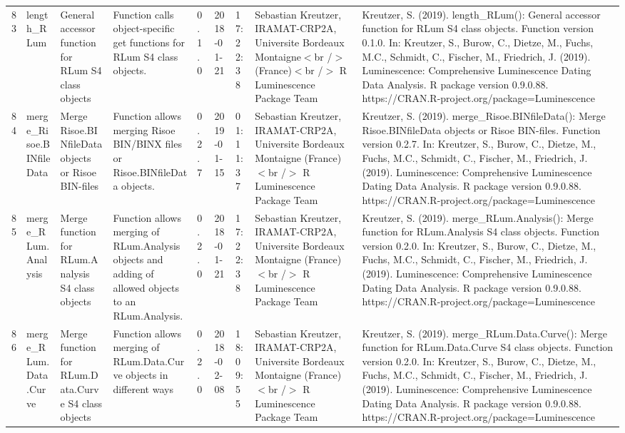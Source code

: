\begin{table}[ht]
\begin{tabular}{rllllllll}
  83 & length\_RLum & General accessor function for RLum S4 class objects & Function calls object-specific get functions for RLum S4 class objects. & 0.1.0 & 2018-01-21 & 17:22:38
 & Sebastian Kreutzer, IRAMAT-CRP2A, Universite Bordeaux Montaigne$<$br /$>$ (France)$<$br /$>$  R Luminescence Package Team & Kreutzer, S. (2019). length\_RLum(): General accessor function for RLum S4 class objects. Function version 0.1.0. In: Kreutzer, S., Burow, C., Dietze, M., Fuchs, M.C., Schmidt, C., Fischer, M., Friedrich, J. (2019). Luminescence: Comprehensive Luminescence Dating Data Analysis. R package version 0.9.0.88. https://CRAN.R-project.org/package=Luminescence
 \\ 
  84 & merge\_Risoe.BINfileData & Merge Risoe.BINfileData objects or Risoe BIN-files & Function allows merging Risoe BIN/BINX files or Risoe.BINfileData objects. & 0.2.7 & 2019-01-15 & 01:11:37
 & Sebastian Kreutzer, IRAMAT-CRP2A, Universite Bordeaux Montaigne (France)$<$br /$>$  R Luminescence Package Team & Kreutzer, S. (2019). merge\_Risoe.BINfileData(): Merge Risoe.BINfileData objects or Risoe BIN-files. Function version 0.2.7. In: Kreutzer, S., Burow, C., Dietze, M., Fuchs, M.C., Schmidt, C., Fischer, M., Friedrich, J. (2019). Luminescence: Comprehensive Luminescence Dating Data Analysis. R package version 0.9.0.88. https://CRAN.R-project.org/package=Luminescence
 \\ 
  85 & merge\_RLum.Analysis & Merge function for RLum.Analysis S4 class objects & Function allows merging of RLum.Analysis objects and adding of allowed objects to an RLum.Analysis. & 0.2.0 & 2018-01-21 & 17:22:38
 & Sebastian Kreutzer, IRAMAT-CRP2A, Universite Bordeaux Montaigne (France)$<$br /$>$  R Luminescence Package Team & Kreutzer, S. (2019). merge\_RLum.Analysis(): Merge function for RLum.Analysis S4 class objects. Function version 0.2.0. In: Kreutzer, S., Burow, C., Dietze, M., Fuchs, M.C., Schmidt, C., Fischer, M., Friedrich, J. (2019). Luminescence: Comprehensive Luminescence Dating Data Analysis. R package version 0.9.0.88. https://CRAN.R-project.org/package=Luminescence
 \\ 
  86 & merge\_RLum.Data.Curve & Merge function for RLum.Data.Curve S4 class objects & Function allows merging of RLum.Data.Curve objects in different ways & 0.2.0 & 2018-02-08 & 18:09:55
 & Sebastian Kreutzer, IRAMAT-CRP2A, Universite Bordeaux Montaigne (France)$<$br /$>$  R Luminescence Package Team & Kreutzer, S. (2019). merge\_RLum.Data.Curve(): Merge function for RLum.Data.Curve S4 class objects. Function version 0.2.0. In: Kreutzer, S., Burow, C., Dietze, M., Fuchs, M.C., Schmidt, C., Fischer, M., Friedrich, J. (2019). Luminescence: Comprehensive Luminescence Dating Data Analysis. R package version 0.9.0.88. https://CRAN.R-project.org/package=Luminescence

\end{tabular}
\end{table}
